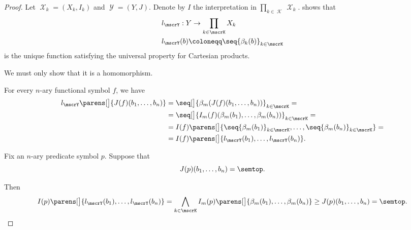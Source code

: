 \begin{proof}
  Let \( \mscrX_k = (X_k, I_k) \) and \( \mscrY = (Y, J) \). Denote by \( I \) the interpretation in \( \prod_{k \in \mscrK} \mscrX_k \).  shows that
  \begin{equation*}
    \begin{aligned}
      &l_\mscrY: Y \to \prod_{k \in \mscrK} X_k \\
      &l_\mscrY(b) \coloneqq \seq{ \beta_k(b) }_{k \in \mscrK}
    \end{aligned}
  \end{equation*}
  is the unique function satisfying the universal property for Cartesian products.

  We must only show that it is a homomorphism.

   For every \( n \)-ary functional symbol \( f \), we have
  \begin{align*}
    l_\mscrY\parens[\big]{ J(f)(b_1, \ldots, b_n) }
    &=
    \seq[\big]{ \beta_m(J(f)(b_1, \ldots, b_n)) }_{k \in \mscrK}
    = \\ &=
    \seq[\big]{ I_m(f)(\beta_m(b_1), \ldots, \beta_m(b_n)) }_{k \in \mscrK}
    = \\ &=
    I(f)\parens[\big]{ \seq{ \beta_m(b_1) }_{k \in \mscrK}, \ldots, \seq{ \beta_m(b_n) }_{k \in \mscrK} }
    = \\ &=
    I(f)\parens[\big]{ l_\mscrY(b_1), \ldots, l_\mscrY(b_n) }.
  \end{align*}

   Fix an \( n \)-ary predicate symbol \( p \). Suppose that
  \begin{equation*}
    J(p)(b_1, \ldots, b_n) = \semtop.
  \end{equation*}

  Then
  \begin{equation*}
    I(p)\parens[\big]{ l_\mscrY(b_1), \ldots, l_\mscrY(b_n) }
    =
    \bigwedge_{k \in \mscrK} I_m(p)\parens[\big]{ \beta_m(b_1), \ldots, \beta_m(b_n) }
    \geq
    J(p)(b_1, \ldots, b_n)
    =
    \semtop.
  \end{equation*}
\end{proof}

